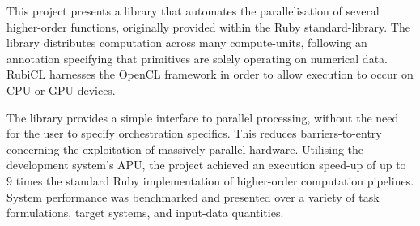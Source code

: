 This project presents a library that automates the parallelisation of several higher-order functions, originally provided within the Ruby standard-library.
The library distributes computation across many compute-units, following an annotation specifying that primitives are solely operating on numerical data. RubiCL harnesses the OpenCL framework in order to allow execution to occur on CPU or GPU devices.

The library provides a simple interface to parallel processing, without the need for the user to specify orchestration specifics. This reduces barriers-to-entry concerning the exploitation of massively-parallel hardware. Utilising the development system's APU, the project achieved an execution speed-up of up to $9$ times the standard Ruby implementation of higher-order computation pipelines. System performance was benchmarked and presented over a variety of task formulations, target systems, and input-data quantities.
